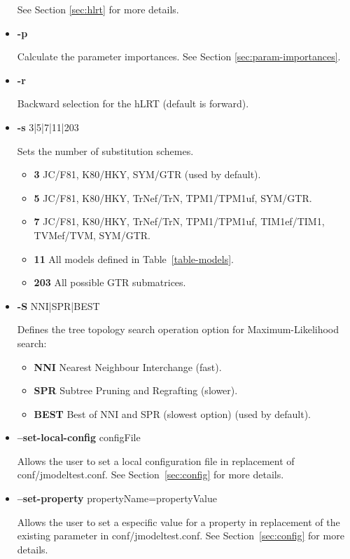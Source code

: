 \begin{itemize}
See Section \ref{sec:hlrt} for more details.

\item  {\bf -p}

Calculate the parameter importances. See Section \ref{sec:param-importances}.

\item  {\bf -r}

Backward selection for the hLRT (default is forward).

\item  {\bf -s} 3|5|7|11|203

Sets the number of substitution schemes.
\begin{itemize}
     \item {\bf 3} JC/F81, K80/HKY, SYM/GTR (used by default).
     \item {\bf 5} JC/F81, K80/HKY, TrNef/TrN, TPM1/TPM1uf, SYM/GTR.
     \item {\bf 7} JC/F81, K80/HKY, TrNef/TrN, TPM1/TPM1uf, TIM1ef/TIM1, TVMef/TVM, SYM/GTR.
     \item {\bf 11} All models defined in Table~\ref{table-models}.
     \item {\bf 203} All possible GTR submatrices.
\end{itemize}

\item  {\bf -S} NNI|SPR|BEST

Defines the tree topology search operation option for Maximum-Likelihood search: 
\begin{itemize}
     \item {\bf NNI} Nearest Neighbour Interchange (fast).
     \item {\bf SPR} Subtree Pruning and Regrafting (slower).
     \item {\bf BEST} Best of NNI and SPR (slowest option) (used by default).
\end{itemize}

\item  {\bf --set-local-config} configFile
\label{pp:args-config}

Allows the user to set a local configuration file in replacement of conf/jmodeltest.conf.
See Section~\ref{sec:config} for more details.

\item  {\bf --set-property} propertyName=propertyValue

Allows the user to set a especific value for a property in replacement of the existing parameter in conf/jmodeltest.conf.
See Section~\ref{sec:config} for more details.


\end{itemize}

